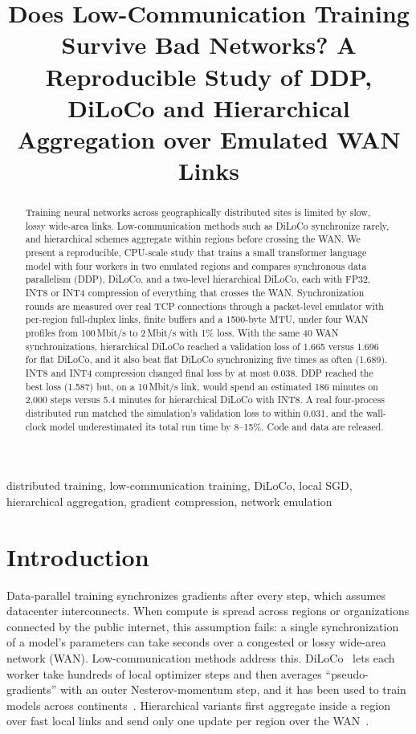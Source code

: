 \documentclass[conference]{IEEEtran}
\begin{document}
\title{Does Low-Communication Training Survive Bad Networks? A Reproducible Study of DDP, DiLoCo and Hierarchical Aggregation over Emulated WAN Links}

\author{
}

\maketitle

\begin{abstract}
Training neural networks across geographically distributed sites is limited by slow, lossy wide-area links. Low-communication methods such as DiLoCo synchronize rarely, and hierarchical schemes aggregate within regions before crossing the WAN. We present a reproducible, CPU-scale study that trains a small transformer language model with four workers in two emulated regions and compares synchronous data parallelism (DDP), DiLoCo, and a two-level hierarchical DiLoCo, each with FP32, INT8 or INT4 compression of everything that crosses the WAN. Synchronization rounds are measured over real TCP connections through a packet-level emulator with per-region full-duplex links, finite buffers and a 1500-byte MTU, under four WAN profiles from 100\,Mbit/s to 2\,Mbit/s with 1\% loss. With the same 40 WAN synchronizations, hierarchical DiLoCo reached a validation loss of 1.665 versus 1.696 for flat DiLoCo, and it also beat flat DiLoCo synchronizing five times as often (1.689). INT8 and INT4 compression changed final loss by at most 0.038. DDP reached the best loss (1.587) but, on a 10\,Mbit/s link, would spend an estimated 186 minutes on 2,000 steps versus 5.4 minutes for hierarchical DiLoCo with INT8. A real four-process distributed run matched the simulation's validation loss to within 0.031, and the wall-clock model underestimated its total run time by 8--15\%. Code and data are released.
\end{abstract}

\begin{IEEEkeywords}
distributed training, low-communication training, DiLoCo, local SGD, hierarchical aggregation, gradient compression, network emulation
\end{IEEEkeywords}

\section{Introduction}
Data-parallel training synchronizes gradients after every step, which assumes datacenter interconnects. When compute is spread across regions or organizations connected by the public internet, this assumption fails: a single synchronization of a model's parameters can take seconds over a congested or lossy wide-area network (WAN). Low-communication methods address this. DiLoCo~\cite{diloco} lets each worker take hundreds of local optimizer steps and then averages ``pseudo-gradients'' with an outer Nesterov-momentum step, and it has been used to train models across continents~\cite{opendiloco,intellect1}. Hierarchical variants first aggregate inside a region over fast local links and send only one update per region over the WAN~\cite{halos,lin2020}.
\end{document}
